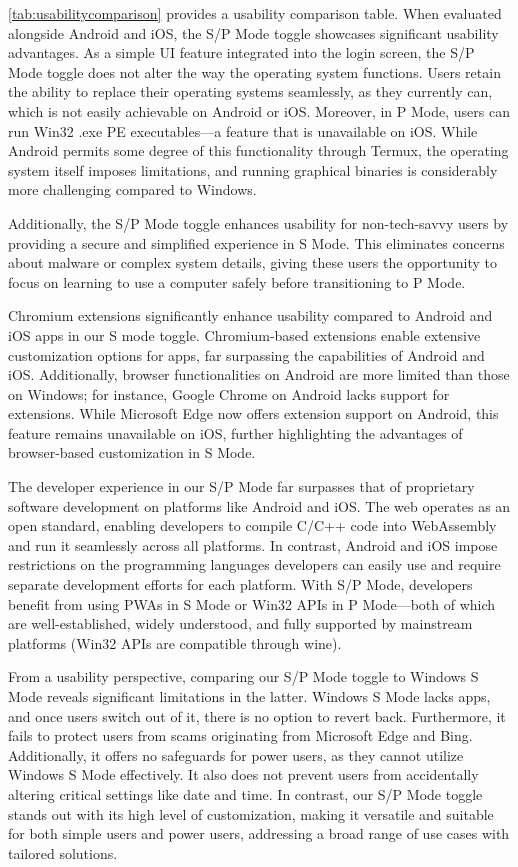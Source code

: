 \autoref{tab:usabilitycomparison} provides a usability comparison table. When evaluated alongside Android and iOS, the S/P Mode toggle showcases significant usability advantages. As a simple UI feature integrated into the login screen, the S/P Mode toggle does not alter the way the operating system functions. Users retain the ability to replace their operating systems seamlessly, as they currently can, which is not easily achievable on Android or iOS. Moreover, in P Mode, users can run Win32 .exe PE executables—a feature that is unavailable on iOS. While Android permits some degree of this functionality through Termux, the operating system itself imposes limitations, and running graphical binaries is considerably more challenging compared to Windows.

Additionally, the S/P Mode toggle enhances usability for non-tech-savvy users by providing a secure and simplified experience in S Mode. This eliminates concerns about malware or complex system details, giving these users the opportunity to focus on learning to use a computer safely before transitioning to P Mode.

Chromium extensions significantly enhance usability compared to Android and iOS apps in our S mode toggle. Chromium-based extensions enable extensive customization options for apps, far surpassing the capabilities of Android and iOS. Additionally, browser functionalities on Android are more limited than those on Windows; for instance, Google Chrome on Android lacks support for extensions. While Microsoft Edge now offers extension support on Android, this feature remains unavailable on iOS, further highlighting the advantages of browser-based customization in S Mode.

The developer experience in our S/P Mode far surpasses that of proprietary software development on platforms like Android and iOS. The web operates as an open standard, enabling developers to compile C/C++ code into WebAssembly and run it seamlessly across all platforms. In contrast, Android and iOS impose restrictions on the programming languages developers can easily use and require separate development efforts for each platform. With S/P Mode, developers benefit from using PWAs in S Mode or Win32 APIs in P Mode—both of which are well-established, widely understood, and fully supported by mainstream platforms (Win32 APIs are compatible through wine).

From a usability perspective, comparing our S/P Mode toggle to Windows S Mode reveals significant limitations in the latter. Windows S Mode lacks apps, and once users switch out of it, there is no option to revert back. Furthermore, it fails to protect users from scams originating from Microsoft Edge and Bing. Additionally, it offers no safeguards for power users, as they cannot utilize Windows S Mode effectively. It also does not prevent users from accidentally altering critical settings like date and time. In contrast, our S/P Mode toggle stands out with its high level of customization, making it versatile and suitable for both simple users and power users, addressing a broad range of use cases with tailored solutions.

